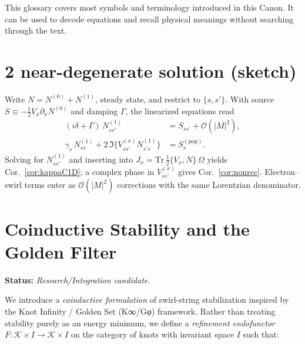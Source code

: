 \documentclass[10pt,reprint,aps,onecolumn,nofootinbib]{revtex4-2}
\begin{document}
    This glossary covers most symbols and terminology introduced in this Canon. It can be used to decode equations and recall physical meanings without searching through the text.








    \section{ 2 near-degenerate solution (sketch)}
    Write $N=N^{(0)}+N^{(1)}$, steady state, and restrict to $\{s,s'\}$. With source $S\equiv -\tfrac12 V_x\partial_x N^{(0)}$ and damping $\Gamma$, the linearized equations read
    \begin{align}
    (i\delta+\Gamma)\,N^{(1)}_{ss'} &= S_{ss'} + \mathcal O(|M|^2),\\
    \gamma_s\,N^{(1)}_{ss} + 2\,\Im\{V^{(x)}_{ss'}N^{(1)}_{s's}\} &= S^{(\mathrm{pop})}_s.
    \end{align}
    Solving for $N^{(1)}_{ss'}$ and inserting into $J_x=\mathrm{Tr}\,\tfrac12\{V_x,N\}\,\Omega$ yields Cor.~\ref{cor:kappaC1D}; a complex phase in $V^{(x)}_{ss'}$ gives Cor.~\ref{cor:nonrec}. Electron–swirl terms enter as $\mathcal O(|M|^2)$ corrections with the same Lorentzian denominator.



    \section{Coinductive Stability and the Golden Filter}
    \label{sec:coinductive-golden}

    \noindent
    \textbf{Status:} \emph{Research/Integration candidate.}

    \medskip

    \noindent
    We introduce a \emph{coinductive formulation} of swirl-string stabilization inspired by the
    Knot Infinity / Golden Set (K∞/Gφ) framework.
    Rather than treating stability purely as an energy minimum, we define a
    \emph{refinement endofunctor}
    \(
    F: \mathcal{K}\times I \to \mathcal{K}\times I
    \)
    on the category of knots with invariant space \(I\)
    such that:
\end{document}
